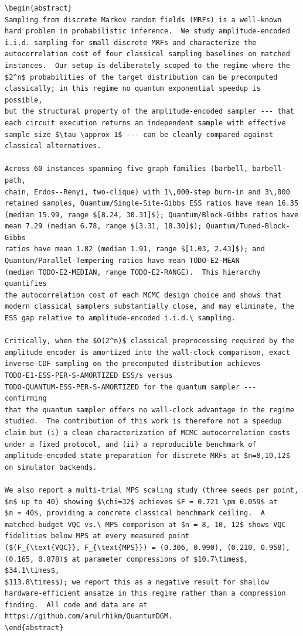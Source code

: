 \begin{verbatim}
\begin{abstract}
Sampling from discrete Markov random fields (MRFs) is a well-known
hard problem in probabilistic inference.  We study amplitude-encoded
i.i.d. sampling for small discrete MRFs and characterize the
autocorrelation cost of four classical sampling baselines on matched
instances.  Our setup is deliberately scoped to the regime where the
$2^n$ probabilities of the target distribution can be precomputed
classically; in this regime no quantum exponential speedup is possible,
but the structural property of the amplitude-encoded sampler --- that
each circuit execution returns an independent sample with effective
sample size $\tau \approx 1$ --- can be cleanly compared against
classical alternatives.

Across 60 instances spanning five graph families (barbell, barbell-path,
chain, Erdos--Renyi, two-clique) with 1\,000-step burn-in and 3\,000
retained samples, Quantum/Single-Site-Gibbs ESS ratios have mean 16.35
(median 15.99, range $[8.24, 30.31]$); Quantum/Block-Gibbs ratios have
mean 7.29 (median 6.78, range $[3.31, 18.30]$); Quantum/Tuned-Block-Gibbs
ratios have mean 1.82 (median 1.91, range $[1.03, 2.43]$); and
Quantum/Parallel-Tempering ratios have mean TODO-E2-MEAN
(median TODO-E2-MEDIAN, range TODO-E2-RANGE).  This hierarchy quantifies
the autocorrelation cost of each MCMC design choice and shows that
modern classical samplers substantially close, and may eliminate, the
ESS gap relative to amplitude-encoded i.i.d.\ sampling.

Critically, when the $O(2^n)$ classical preprocessing required by the
amplitude encoder is amortized into the wall-clock comparison, exact
inverse-CDF sampling on the precomputed distribution achieves
TODO-E1-ESS-PER-S-AMORTIZED ESS/s versus
TODO-QUANTUM-ESS-PER-S-AMORTIZED for the quantum sampler --- confirming
that the quantum sampler offers no wall-clock advantage in the regime
studied.  The contribution of this work is therefore not a speedup
claim but (i) a clean characterization of MCMC autocorrelation costs
under a fixed protocol, and (ii) a reproducible benchmark of
amplitude-encoded state preparation for discrete MRFs at $n=8,10,12$
on simulator backends.

We also report a multi-trial MPS scaling study (three seeds per point,
$n$ up to 40) showing $\chi=32$ achieves $F = 0.721 \pm 0.059$ at
$n = 40$, providing a concrete classical benchmark ceiling.  A
matched-budget VQC vs.\ MPS comparison at $n = 8, 10, 12$ shows VQC
fidelities below MPS at every measured point
($(F_{\text{VQC}}, F_{\text{MPS}}) = (0.306, 0.990), (0.210, 0.958),
(0.165, 0.878)$ at parameter compressions of $10.7\times$, $34.1\times$,
$113.8\times$); we report this as a negative result for shallow
hardware-efficient ansatze in this regime rather than a compression
finding.  All code and data are at
https://github.com/arulrhikm/QuantumDGM.
\end{abstract}
\end{verbatim}

